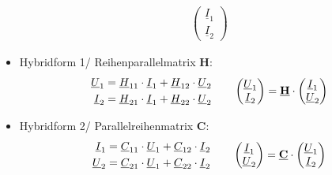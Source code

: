 \begin{itemize}[leftmargin=*]
\begin{align*}
\begin{pmatrix}
                    \underline{I}_1 \\
                    \underline{I}_2
                \end{pmatrix}  
            \end{align*}
        \item{Hybridform 1/ Reihenparallelmatrix \textbf{H}:}
            \begin{align*}
                \begin{split}
                    \underline{U}_1 &= \underline{H}_{11}\cdot\underline{I}_1 + \underline{H}_{12}\cdot\underline{U}_2 \\
                    \underline{I}_2 &= \underline{H}_{21}\cdot\underline{I}_1 + \underline{H}_{22}\cdot\underline{U}_2
                \end{split}
				\qquad	
                \begin{pmatrix}
                    \underline{U}_1 \\
                    \underline{I}_2
                \end{pmatrix} = \textbf{\underline{H}}\cdot
                \begin{pmatrix}
                    \underline{I}_1 \\
                    \underline{U}_2
                \end{pmatrix}
            \end{align*}
            \item{Hybridform 2/ Parallelreihenmatrix \textbf{C}:}
            \begin{align*}
                \begin{split}
                    \underline{I}_1 &= \underline{C}_{11}\cdot\underline{U}_1 + \underline{C}_{12}\cdot\underline{I}_2 \\
                    \underline{U}_2 &= \underline{C}_{21}\cdot\underline{U}_1 + \underline{C}_{22}\cdot\underline{I}_2
                \end{split}
				\qquad
                \begin{pmatrix}
                    \underline{I}_1 \\
                    \underline{U}_2
                \end{pmatrix} = \textbf{\underline{C}}\cdot
                \begin{pmatrix}
                    \underline{U}_1 \\
                    \underline{I}_2
                \end{pmatrix}
            \end{align*}
            

\end{itemize}
